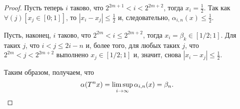 \begin{proof}
	Пусть теперь $i$ таково, что $2^{2m+1}<i<2^{2m+2}$,
	тогда $x_i = \frac{1}{2}$.
	Так как
	$\forall(j)\left[x_j\in[0;1]\right]$,
	то
	$|x_i - x_j| \leq \frac{1}{2}$
	и, следовательно,
	$\alpha_{i,n}(x)  \leq \frac{1}{2}$.

	Пусть, наконец, $i$ таково, что $2^{2m}<i \leq 2^{2m+2}$,
	тогда
	$x_i = \beta_k \in [1/2;1]$.
	Для таких $j$, что $i<j\leq 2i-n$ и, более того,
	для любых таких $j$, что $2^{2m}<j<2^{2m+2}$
	выполнено $x_j\in[1/2; 1]$
	и, значит, снова $|x_i - x_j| \leq \frac{1}{2}$.

	Таким образом, получаем, что
	\begin{equation}
		\alpha(T^n x) = \varlimsup_{i \to \infty} \alpha_{i,n}(x) = \beta_n
		.
	\end{equation}
\end{proof}
